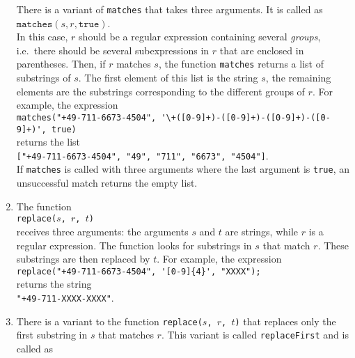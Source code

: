 \begin{enumerate}
      There is a variant of \texttt{matches} that takes three arguments.  It is called as
      \\[0.2cm]
      \hspace*{1.3cm}
      $\texttt{matches}(s, r, \mathtt{true})$.
      \\[0.2cm]
      In this case, $r$ should be a regular expression containing several \emph{groups},
      i.e.~there should be several subexpressions in $r$ that are enclosed in
      parentheses.  Then, if $r$ matches $s$, the function \texttt{matches} returns a list
      of substrings of $s$.  The first element of this list is  the  string $s$,
      the remaining elements are the substrings corresponding to the different groups of $r$.
      For example, the expression
      \\[0.2cm]
      \hspace*{0.3cm}
      \verb|matches("+49-711-6673-4504", '\+([0-9]+)-([0-9]+)-([0-9]+)-([0-9]+)', true)|
      \\[0.2cm]
      returns the list
      \\[0.2cm]
      \hspace*{1.3cm}
      \texttt{["+49-711-6673-4504", "49", "711", "6673", "4504"]}.
      \\[0.2cm]
      If \texttt{matches} is called with three arguments where the last argument is
      \texttt{true}, an unsuccessful match returns the empty list.
\item The function
      \\[0.2cm]
      \hspace*{1.3cm}
      \texttt{replace($s$, $r$, $t$)}
      \\[0.2cm]
      receives three arguments: the arguments $s$ and $t$ are strings, while $r$ is a
      regular expression.  The function looks for substrings in $s$ that match $r$.  These
      substrings are then replaced by $t$.  For example, the expression
      \\[0.2cm]
      \hspace*{1.3cm}
      \verb|replace("+49-711-6673-4504", '[0-9]{4}', "XXXX");| 
      \\[0.2cm]
      returns the string
      \\[0.2cm]
      \hspace*{1.3cm}
      \verb|"+49-711-XXXX-XXXX"|.
\item There is a variant to the function \texttt{replace($s$, $r$, $t$)} that replaces only the first substring in $s$
      that matches $r$.  This variant is called \texttt{replaceFirst} and is called as

\end{enumerate}

